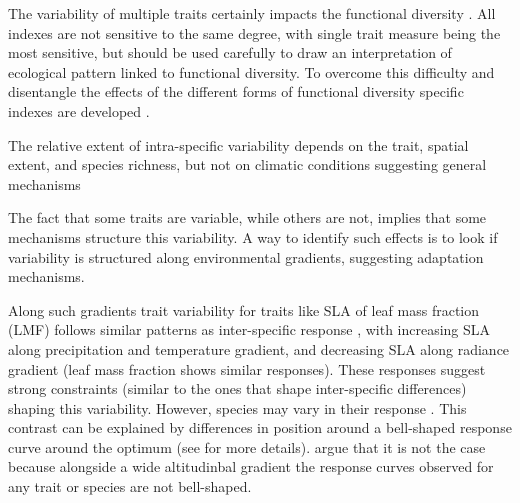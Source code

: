 The variability of multiple traits certainly impacts the functional diversity \parencite{de_bello_quantifying_2011, albert_importance_2012}. All indexes are not sensitive to the same degree, with single trait measure being the most sensitive, but should be used carefully to draw an interpretation of ecological pattern linked to functional diversity. To overcome this difficulty and disentangle the effects of the different forms of functional diversity specific indexes are developed \parencite{de_bello_quantifying_2011}.

The relative extent of intra-specific variability depends on the trait, spatial extent, and species richness, but not on climatic conditions \parencite{siefert_global_2015} suggesting general mechanisms 
%
%
%





The fact that some traits are variable, while others are not, implies that some mechanisms structure this variability.
A way to identify such effects is to look if variability is structured along environmental gradients, suggesting adaptation mechanisms.

Along such gradients trait variability for traits like SLA \parencite{poorter_causes_2009} of leaf mass fraction (LMF) \parencite{poorter_biomass_2012} follows similar patterns as inter-specific response \parencite{niinemets_global-scale_2001}, with increasing SLA along precipitation and temperature gradient, and decreasing SLA along radiance gradient (leaf mass fraction shows similar responses). These responses suggest strong constraints (similar to the ones that shape inter-specific differences) shaping this variability. However, species may vary in their response \parencite{kichenin_contrasting_2013}. This contrast can be explained by differences in position around a bell-shaped response curve around the optimum (see \cite{albert_intraspecific_2010} for more details). \cite{kichenin_contrasting_2013} argue that it is not the case because alongside a wide altitudinbal gradient the response curves observed for any trait or species are not bell-shaped.

